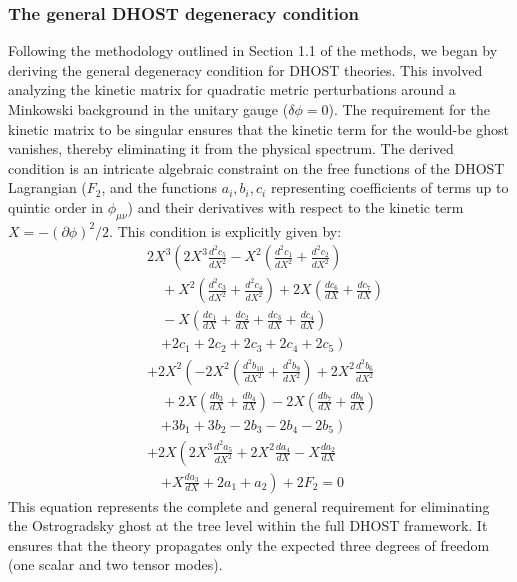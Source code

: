 \documentclass[twocolumn]{aastex631}
\begin{document}
\subsubsection{The general DHOST degeneracy condition}
Following the methodology outlined in Section 1.1 of the methods, we began by deriving the general degeneracy condition for DHOST theories. This involved analyzing the kinetic matrix for quadratic metric perturbations around a Minkowski background in the unitary gauge ($\delta\phi=0$). The requirement for the kinetic matrix to be singular ensures that the kinetic term for the would-be ghost vanishes, thereby eliminating it from the physical spectrum. The derived condition is an intricate algebraic constraint on the free functions of the DHOST Lagrangian ($F_2$, and the functions $a_i, b_i, c_i$ representing coefficients of terms up to quintic order in $\phi_{\mu\nu}$) and their derivatives with respect to the kinetic term $X = - (\partial\phi)^2/2$. This condition is explicitly given by:
\begin{align} \label{eq:degeneracy_condition}
    & 2X^3 \left(2X^3 \frac{d^2 c_5}{dX^2} - X^2 \left(\frac{d^2 c_1}{dX^2} + \frac{d^2 c_2}{dX^2}\right) \right. \nonumber \\
    & \quad + X^2 \left(\frac{d^2 c_3}{dX^2} + \frac{d^2 c_4}{dX^2}\right) + 2X \left(\frac{d c_6}{dX} + \frac{d c_7}{dX}\right) \nonumber \\
    & \quad - X \left(\frac{d c_1}{dX} + \frac{d c_2}{dX} + \frac{d c_3}{dX} + \frac{d c_4}{dX}\right) \nonumber \\
    & \quad \left. + 2c_1 + 2c_2 + 2c_3 + 2c_4 + 2c_5\right) \nonumber \\
    & + 2X^2 \left(-2X^2 \left(\frac{d^2 b_{10}}{dX^2} + \frac{d^2 b_9}{dX^2}\right) + 2X^2 \frac{d^2 b_6}{dX^2} \right. \nonumber \\
    & \quad + 2X \left(\frac{d b_3}{dX} + \frac{d b_4}{dX}\right) - 2X \left(\frac{d b_7}{dX} + \frac{d b_8}{dX}\right) \nonumber \\
    & \quad \left. + 3b_1 + 3b_2 - 2b_3 - 2b_4 - 2b_5\right) \nonumber \\
    & + 2X \left(2X^3 \frac{d^2 a_5}{dX^2} + 2X^2 \frac{d a_4}{dX} - X \frac{d a_2}{dX} \right. \nonumber \\
    & \quad \left. + X \frac{d a_3}{dX} + 2a_1 + a_2\right) + 2F_2 = 0
\end{align}
This equation represents the complete and general requirement for eliminating the Ostrogradsky ghost at the tree level within the full DHOST framework. It ensures that the theory propagates only the expected three degrees of freedom (one scalar and two tensor modes).
\end{document}
